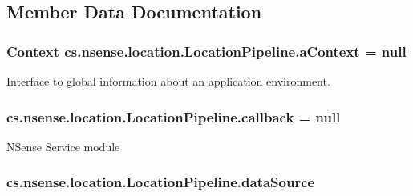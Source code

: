 \subsection{Member Data Documentation}
\hypertarget{classcs_1_1nsense_1_1location_1_1_location_pipeline_a088a4816ce7174ab8e12366afb66d601}{
\subsubsection[{a\-Context}]{\setlength{\rightskip}{0pt plus 5cm}Context cs.\-nsense.\-location.\-Location\-Pipeline.\-a\-Context = null\hspace{0.3cm}{\ttfamily [private]}}}\label{classcs_1_1nsense_1_1location_1_1_location_pipeline_a088a4816ce7174ab8e12366afb66d601}
Interface to global information about an application environment. \hypertarget{classcs_1_1nsense_1_1location_1_1_location_pipeline_afcdbeb2f3124b5691157458e2d30d9ee}{
\subsubsection[{callback}]{ cs.\-nsense.\-location.\-Location\-Pipeline.\-callback = null\hspace{0.3cm}{\ttfamily [private]}}}\label{classcs_1_1nsense_1_1location_1_1_location_pipeline_afcdbeb2f3124b5691157458e2d30d9ee}
N\-Sense Service module \hypertarget{classcs_1_1nsense_1_1location_1_1_location_pipeline_af961a79b95c12db602887805d44dc0d2}{
\subsubsection[{data\-Source}]{ cs.\-nsense.\-location.\-Location\-Pipeline.\-data\-Source\hspace{0.3cm}{\ttfamily [private]}}}\label{classcs_1_1nsense_1_1location_1_1_location_pipeline_af961a79b95c12db602887805d44dc0d2}
